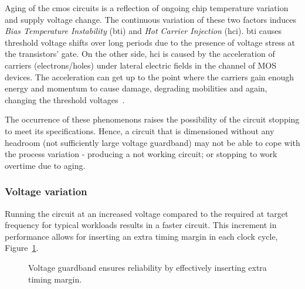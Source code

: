 Aging of the \acrshort{cmos} circuits is a reflection of ongoing chip temperature variation and supply voltage change. The continuous variation of these two factors induces \textit{Bias Temperature Instability} (\acrshort{bti}) and  \textit{Hot Carrier Injection} (\acrshort{hci}). \acrshort{bti} causes threshold voltage shifts over long periods due to the presence of voltage stress at the transistors' gate. On the other side, \acrshort{hci} is caused by the acceleration of carriers (electrons/holes) under lateral electric fields in the channel of MOS devices. The acceleration can get up to the point where the carriers gain enough energy and momentum to cause damage, degrading mobilities and again, changing the threshold voltages~\cite{sapatnekar_what_nodate}.

The occurrence of these phenomenons raises the possibility of the circuit stopping to meet its specifications. Hence, a circuit that is dimensioned without any headroom (not sufficiently large voltage guardband) may not be able to cope with the process variation - producing a not working circuit; or stopping to work overtime due to aging.



\subsubsection{Voltage variation}

Running the circuit at an increased voltage compared to the required at target frequency for typical workloads results in a faster circuit. This increment in performance allows for inserting an extra timing margin in each clock cycle, Figure~\ref{fig:timming_guardband}. 

\begin{figure}[!htb]
  \begin{subfigmatrix}{2}
  \end{subfigmatrix}
  \caption{Voltage guardband ensures reliability by effectively inserting extra timing margin.}
  \label{fig:timming_guardband}
\end{figure}

